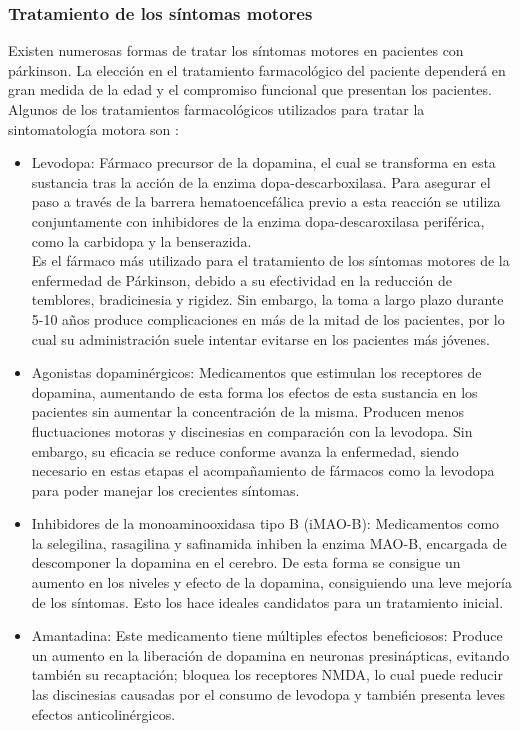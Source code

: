\subsubsection{Tratamiento de los síntomas motores}
Existen numerosas formas de tratar los síntomas motores en pacientes con párkinson. La elección en el tratamiento farmacológico del paciente dependerá en gran medida de la edad y el compromiso funcional que presentan los pacientes. Algunos de los tratamientos farmacológicos utilizados para tratar la sintomatología motora son \cite{marin2018enfermedad}:
\begin{itemize}
    \item Levodopa: Fármaco precursor de la dopamina, el cual se transforma en esta sustancia tras la acción de la enzima dopa-descarboxilasa. Para asegurar el paso a través de la barrera hematoencefálica previo a esta reacción se utiliza conjuntamente con inhibidores de la enzima dopa-descaroxilasa periférica, como la carbidopa y la benserazida. \\
    Es el fármaco más utilizado para el tratamiento de los síntomas motores de la enfermedad de Párkinson, debido a su efectividad en la reducción de temblores, bradicinesia y rigidez. Sin embargo, la toma a largo plazo durante 5-10 años produce complicaciones en más de la mitad de los pacientes, por lo cual su administración suele intentar evitarse en los pacientes más jóvenes.
    \item Agonistas dopaminérgicos: Medicamentos que estimulan los receptores de dopamina, aumentando de esta forma los efectos de esta sustancia en los pacientes sin aumentar la concentración de la misma. Producen menos fluctuaciones motoras y discinesias en comparación con la levodopa. Sin embargo, su eficacia se reduce conforme avanza la enfermedad, siendo necesario en estas etapas el acompañamiento de fármacos como la levodopa para poder manejar los crecientes síntomas.
    \item Inhibidores de la monoaminooxidasa tipo B (iMAO-B): Medicamentos como la selegilina, rasagilina y safinamida inhiben la enzima MAO-B, encargada de descomponer la dopamina en el cerebro. De esta forma se consigue un aumento en los niveles y efecto de la dopamina, consiguiendo una leve mejoría de los síntomas. Esto los hace ideales candidatos para un tratamiento inicial.
    \item Amantadina: Este medicamento tiene múltiples efectos beneficiosos: Produce un aumento en la liberación de dopamina en neuronas presinápticas, evitando también su recaptación; bloquea los receptores NMDA, lo cual puede reducir las discinesias causadas por el consumo de levodopa y también presenta leves efectos anticolinérgicos.

\end{itemize}
